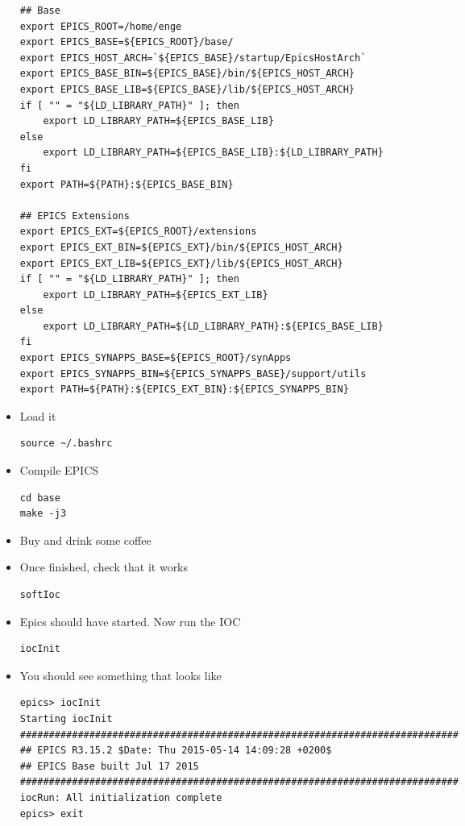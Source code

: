 \documentclass[11pt]{article}
\begin{document}
\begin{itemize}
\begin{verbatim}
## Base
export EPICS_ROOT=/home/enge
export EPICS_BASE=${EPICS_ROOT}/base/
export EPICS_HOST_ARCH=`${EPICS_BASE}/startup/EpicsHostArch`
export EPICS_BASE_BIN=${EPICS_BASE}/bin/${EPICS_HOST_ARCH}
export EPICS_BASE_LIB=${EPICS_BASE}/lib/${EPICS_HOST_ARCH}
if [ "" = "${LD_LIBRARY_PATH}" ]; then
    export LD_LIBRARY_PATH=${EPICS_BASE_LIB}
else
    export LD_LIBRARY_PATH=${EPICS_BASE_LIB}:${LD_LIBRARY_PATH}
fi
export PATH=${PATH}:${EPICS_BASE_BIN}

## EPICS Extensions
export EPICS_EXT=${EPICS_ROOT}/extensions
export EPICS_EXT_BIN=${EPICS_EXT}/bin/${EPICS_HOST_ARCH}
export EPICS_EXT_LIB=${EPICS_EXT}/lib/${EPICS_HOST_ARCH}
if [ "" = "${LD_LIBRARY_PATH}" ]; then
    export LD_LIBRARY_PATH=${EPICS_EXT_LIB}
else
    export LD_LIBRARY_PATH=${LD_LIBRARY_PATH}:${EPICS_BASE_LIB}
fi
export EPICS_SYNAPPS_BASE=${EPICS_ROOT}/synApps
export EPICS_SYNAPPS_BIN=${EPICS_SYNAPPS_BASE}/support/utils
export PATH=${PATH}:${EPICS_EXT_BIN}:${EPICS_SYNAPPS_BIN}
\end{verbatim}
\item Load it
\begin{verbatim}
source ~/.bashrc
\end{verbatim}
\item Compile EPICS
\begin{verbatim}
cd base
make -j3
\end{verbatim}
\item Buy and drink some coffee
\item Once finished, check that it works
\begin{verbatim}
softIoc
\end{verbatim}
\item Epics should have started. Now run the IOC
\begin{verbatim}
iocInit
\end{verbatim}
\item You should see something that looks like
\begin{verbatim}
epics> iocInit  
Starting iocInit
############################################################################
## EPICS R3.15.2 $Date: Thu 2015-05-14 14:09:28 +0200$
## EPICS Base built Jul 17 2015
############################################################################
iocRun: All initialization complete
epics> exit
\end{verbatim}
\end{itemize}
\end{document}
